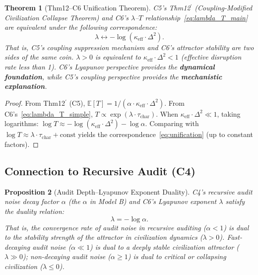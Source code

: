 \documentclass[12pt,a4paper]{article}
\newtheorem{theorem}{Theorem}[section]
\newtheorem{proposition}[theorem]{Proposition}
\theoremstyle{definition}
\newcommand{\coupling}{\kappa}
\newcommand{\ineq}{\Delta}
\newcommand{\E}{\mathbb{E}}
\newcommand{\lb}{\lambda}
\begin{document}
\begin{theorem}[Thm12--C6 Unification Theorem]
\label{thm:unification}
C5's Thm12$^\prime$ (Coupling-Modified Civilization Collapse Theorem) and C6's $\lb$--$T$ relationship~\eqref{eq:lambda_T_main} are equivalent under the following correspondence:
\begin{equation}\label{eq:unification}
    \lb \longleftrightarrow -\log(\coupling_{\text{eff}} \cdot \ineq^2).
\end{equation}
That is, C5's coupling suppression mechanism and C6's attractor stability are two sides of the same coin. $\lb > 0$ is equivalent to $\coupling_{\text{eff}} \cdot \ineq^2 < 1$ (effective disruption rate less than 1). C6's Lyapunov perspective provides the \textbf{dynamical foundation}, while C5's coupling perspective provides the \textbf{mechanistic explanation}.
\end{theorem}

\begin{proof}
From Thm12$^\prime$ (C5), $\E[T] = 1 / (\alpha \cdot \coupling_{\text{eff}} \cdot \ineq^2)$. From C6's~\eqref{eq:lambda_T_simple}, $T \propto \exp(\lb \cdot \tau_{\text{char}})$. When $\coupling_{\text{eff}} \cdot \ineq^2 \ll 1$, taking logarithms: $\log T \approx -\log(\coupling_{\text{eff}} \cdot \ineq^2) - \log \alpha$. Comparing with $\log T \approx \lb \cdot \tau_{\text{char}} + \text{const}$ yields the correspondence~\eqref{eq:unification} (up to constant factors).
\end{proof}

\subsection{Connection to Recursive Audit (C4)}
\label{sec:c4}

\begin{proposition}[Audit Depth--Lyapunov Exponent Duality]
\label{prop:c4_duality}
C4's recursive audit noise decay factor $\alpha$ (the $\alpha$ in Model B) and C6's Lyapunov exponent $\lb$ satisfy the duality relation:
\begin{equation}\label{eq:c4_c6}
    \lb = -\log \alpha.
\end{equation}
That is, the convergence rate of audit noise in recursive auditing ($\alpha < 1$) is dual to the stability strength of the attractor in civilization dynamics ($\lb > 0$). Fast-decaying audit noise ($\alpha \ll 1$) is dual to a deeply stable civilization attractor ($\lb \gg 0$); non-decaying audit noise ($\alpha \geq 1$) is dual to critical or collapsing civilization ($\lb \leq 0$).
\end{proposition}
\end{document}
